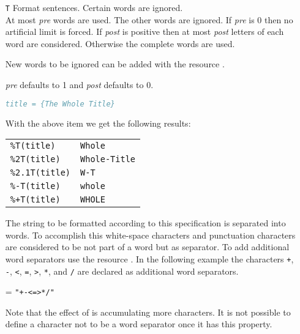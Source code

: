 \documentclass[11pt,a4paper]{scrbook}
\begin{document}
\begin{itemize}
  \item [\texttt{T}] Format sentences. Certain words are 
    ignored.\\
    At most \textit{pre} words are used. The other words are ignored. If
    \textit{pre} is 0 then no artificial limit is forced. If \textit{post} is
    positive then at most \textit{post} letters of each word are considered.
    Otherwise the complete words are used.

    New words to be ignored can be added with the resource .

    \textit{pre} defaults to 1 and \textit{post} defaults to 0.

    \begin{Example}
      \begin{lstlisting}[language=BibTeX]
  title = {The Whole Title}
      \end{lstlisting}\vspace{-2ex}
      With the above item we get the following results:
      
      \begin{tabular}{ll}
        \texttt{\%T(title)}		& \texttt{Whole}		\\
        \texttt{\%2T(title)}	& \texttt{Whole-Title}		\\
        \texttt{\%2.1T(title)}	& \texttt{W-T}			\\
        \texttt{\%-T(title)}	& \texttt{whole}		\\
        \texttt{\%+T(title)}	& \texttt{WHOLE}		
      \end{tabular}
    \end{Example}

    The string to be formatted according to this specification is separated
    into words. To accomplish this white-space characters and punctuation
    characters are considered to be not part of a word but as separator. To
    add additional word separators use the resource .
    In the following example the characters \verb|+|, \verb|-|, \verb|<|,
    \verb|=|, \verb|>|, \verb|*|, and \verb|/| are declared as additional word
    separators.

    \begin{Resources}
       = \texttt{"+-<=>*/"}
    \end{Resources}

    Note that the effect of  is accumulating more
    characters. It is not possible to define a character not to be a word
    separator once it has this property.


\end{itemize}
\end{document}
